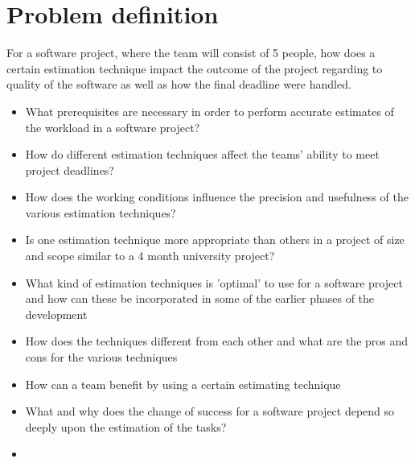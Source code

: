 \section{Problem definition}
For a software project, where the team will consist of 5 people, how does a certain estimation technique impact the outcome of the project regarding to quality of the software as well as how the final deadline were handled. 
\begin{itemize}
\item What prerequisites are necessary in order to perform accurate estimates of the workload in a software project?
\item How do different estimation techniques affect the teams' ability to meet project deadlines?
\item How does the working conditions influence the precision and usefulness of the various estimation techniques?	
\item Is one estimation technique more appropriate than others in a project of size and scope similar to a 4 month university project?


\item What kind of estimation techniques is 'optimal' to use for a software project and how can these be incorporated in some of the earlier phases of the development
\item How does the techniques different from each other and what are the pros and cons for the various techniques
\item How can a team benefit by using a certain estimating technique
\item What and why does the change of success for a software project depend so deeply upon the estimation of the tasks?
\item 

\end{itemize}

